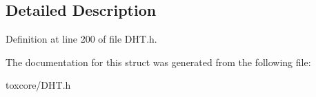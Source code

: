 \subsection{Detailed Description}


Definition at line 200 of file D\+H\+T.\+h.



The documentation for this struct was generated from the following file\+:\begin{DoxyCompactItemize}
\item 
toxcore/D\+H\+T.\+h\end{DoxyCompactItemize}
